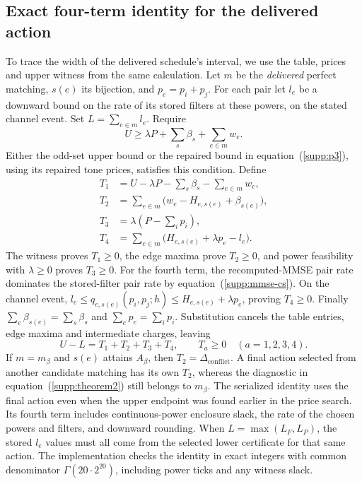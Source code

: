 \documentclass[10pt,letterpaper]{article}
\begin{document}
\subsection{Exact four-term identity for the delivered action}
To trace the width of the delivered schedule's interval, we use the table, prices and upper witness from the same calculation. Let $m$ be the \emph{delivered} perfect matching, $s(e)$ its bijection, and $p_e=p_i+p_j$. For each pair let $l_e$ be a downward bound on the rate of its stored filters at these powers, on the stated channel event. Set $L=\sum_{e\in m}l_e$. Require
\begin{equation}
 U\ge\lambda P+\sum_s\beta_s+\sum_{e\in m}w_e.
 \label{supp:decomposition-witness}
\end{equation}
Either the odd-set upper bound or the repaired bound in equation~(\ref{supp:p3}), using its repaired tone prices, satisfies this condition. Define
\begin{equation}
 \begin{aligned}
 T_1&=U-\lambda P-\sum_s\beta_s-\sum_{e\in m}w_e,\\
 T_2&=\sum_{e\in m}\bigl(w_e-H_{e,s(e)}+\beta_{s(e)}\bigr),\\
 T_3&=\lambda\left(P-\sum_i p_i\right),\\
 T_4&=\sum_{e\in m}\bigl(H_{e,s(e)}+\lambda p_e-l_e\bigr).
 \end{aligned}
 \label{supp:four_terms}
\end{equation}
The witness proves $T_1\ge0$, the edge maxima prove $T_2\ge0$, and power feasibility with $\lambda\ge0$ proves $T_3\ge0$. For the fourth term, the recomputed-MMSE pair rate dominates the stored-filter pair rate by equation~(\ref{supp:mmse-cs}). On the channel event,
$l_e\le q_{e,s(e)}(p_i,p_j;h)\le H_{e,s(e)}+\lambda p_e$, proving $T_4\ge0$. Finally $\sum_e\beta_{s(e)}=\sum_s\beta_s$ and $\sum_e p_e=\sum_i p_i$. Substitution cancels the table entries, edge maxima and intermediate charges, leaving
\begin{equation}
 U-L=T_1+T_2+T_3+T_4,\qquad T_a\ge0\quad(a=1,2,3,4).
 \label{supp:decomposition-identity}
\end{equation}
If $m=m_\beta$ and $s(e)$ attains $A_\beta$, then $T_2=\Delta_{\mathrm{conflict}}$. A final action selected from another candidate matching has its own $T_2$, whereas the diagnostic in equation~(\ref{supp:theorem2}) still belongs to $m_\beta$. The serialized identity uses the final action even when the upper endpoint was found earlier in the price search. Its fourth term includes continuous-power enclosure slack, the rate of the chosen powers and filters, and downward rounding. When $L=\max(L_F,L_P)$, the stored $l_e$ values must all come from the selected lower certificate for that same action. The implementation checks the identity in exact integers with common denominator $\Gamma(20\cdot2^{20})$, including power ticks and any witness slack.
\end{document}
